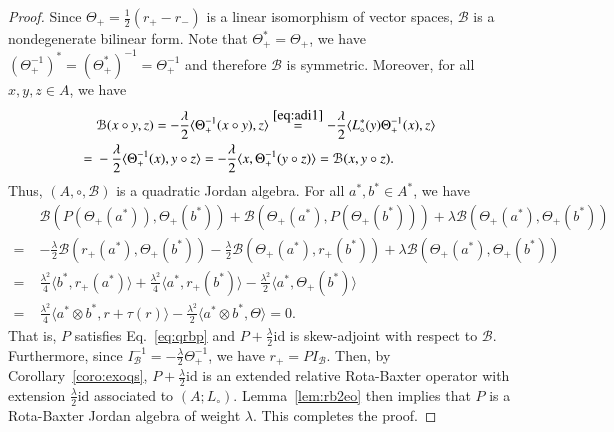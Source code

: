 \documentclass[12pt, reqno, a4paper]{amsart}
\theoremstyle{definition}
\newcommand{\id}{\mathrm{id}}
\begin{document}
\begin{proof}
	Since $\Theta_{+} = \frac{1}{2}(r_{+} - r_{-})$ is a linear isomorphism of vector spaces, $\mathcal{B}$ is a nondegenerate bilinear form.
	Note that $\Theta_{+}^* = \Theta_{+}$, we have $(\Theta_{+}^{-1})^* = (\Theta_{+}^{*}) ^{-1} = \Theta_{+}^{-1}$ and therefore $\mathcal{B}$ is symmetric.
	Moreover, for all $x, y, z \in A$, we have
	\begin{align*}
		&\mathcal{B}(x \circ y, z)  = -\frac{\lambda}{2}\langle \Theta_+^{-1} (x \circ y) , z \rangle \overset{\eqref{eq:adi1}}{=} -\frac{\lambda}{2}\langle L_{\circ}^*(y)\Theta_+^{-1} (x) , z \rangle \\
		=\;& -\frac{\lambda}{2}\langle \Theta_+^{-1} (x) , y \circ z \rangle = -\frac{\lambda}{2}\langle x , \Theta_+^{-1}(y \circ z) \rangle = \mathcal{B}(x, y \circ z).
	\end{align*}
	Thus, $(A, \circ, \mathcal{B})$ is a quadratic Jordan algebra.
	For all $a^*, b^* \in A^*$, we have
	\begin{align*}
		& \mathcal{B}(P(\Theta_{+}(a^*)), \Theta_{+}(b^*)) + \mathcal{B}(\Theta_{+}(a^*), P(\Theta_{+}(b^*))) + \lambda \mathcal{B}(\Theta_{+}(a^*), \Theta_{+}(b^*))                              \\
		=\; & -\frac{\lambda}{2}\mathcal{B}(r_{+}(a^*), \Theta_{+}(b^*)) -\frac{\lambda}{2} \mathcal{B}(\Theta_{+}(a^*), r_{+}(b^*)) + \lambda \mathcal{B}(\Theta_{+}(a^*), \Theta_{+}(b^*)) \\
		=\; & \frac{\lambda^2}{4} \langle b^*, r_{+}(a^*)\rangle + \frac{\lambda^2}{4} \langle a^*, r_{+}(b^*)\rangle -\frac{\lambda^2}{2} \langle a^*, \Theta_{+}(b^*)\rangle   \\
		=\; & \frac{\lambda^2}{4}\langle a^* \otimes b^*, r + \tau(r) \rangle - \frac{\lambda^2}{2} \langle a^* \otimes b^*, \Theta \rangle =  0.
	\end{align*}
	That is, $P$ satisfies Eq.~\eqref{eq:qrbp} and $P + \frac{\lambda}{2}\id$ is skew-adjoint with respect to $\mathcal{B}$.
	Furthermore, since $I_\mathcal{B}^{-1} = - \frac{\lambda}{2}  \Theta_{+}^{-1}$, we have $r_{+} = PI_\mathcal{B}$.
	Then, by Corollary~\ref{coro:exoqs}, $P + \frac{\lambda}{2}\id$ is an extended relative Rota-Baxter operator with extension $\frac{\lambda}{2}\id$ associated to $(A; L_{\circ})$.
	Lemma~\ref{lem:rb2eo} then implies that $P$ is a Rota-Baxter Jordan algebra of weight $\lambda$.
	This completes the proof.
\end{proof}
\end{document}
